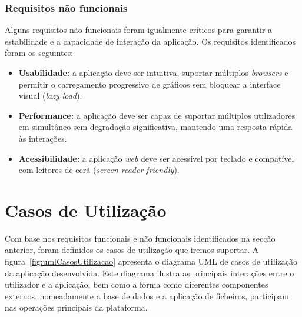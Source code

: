 \subsubsection{Requisitos não funcionais}

Alguns requisitos não funcionais foram igualmente críticos para garantir a estabilidade e a capacidade de interação da aplicação. Os requisitos identificados foram os seguintes:

\begin{itemize}
    \item \textbf{Usabilidade:} a aplicação deve ser intuitiva, suportar múltiplos \textit{browsers} e permitir o carregamento progressivo de gráficos sem bloquear a interface visual (\textit{lazy load}).
    
    \item \textbf{Performance:} a aplicação deve ser capaz de suportar múltiplos utilizadores em simultâneo sem degradação significativa, mantendo uma resposta rápida às interações.
    
    \item \textbf{Acessibilidade:} a aplicação \textit{web} deve ser acessível por teclado e compatível com leitores de ecrã (\textit{screen-reader friendly}).

\end{itemize}

\section{Casos de Utilização}
\label{ch:casosUtilizacao}

Com base nos requisitos funcionais e não funcionais identificados na secção anterior, foram definidos os casos de utilização que iremos suportar. A figura~\ref{fig:umlCasosUtilizacao} apresenta o diagrama UML de casos de utilização da aplicação desenvolvida. Este diagrama ilustra as principais interações entre o utilizador e a aplicação, bem como a forma como diferentes componentes externos, nomeadamente a base de dados e a aplicação de ficheiros, participam nas operações principais da plataforma.


